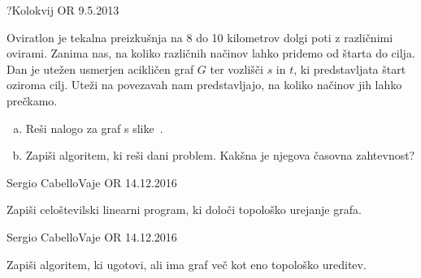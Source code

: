 \begin{naloga}{?}{Kolokvij OR 9.5.2013}
\begin{vprasanje}[oviratlon]
Oviratlon je tekalna preizkušnja
na 8 do 10 kilometrov dolgi poti z različnimi ovirami.
Zanima nas, na koliko različnih načinov lahko pridemo od štarta do cilja.
Dan je utežen usmerjen acikličen graf $G$ ter vozlišči $s$ in $t$,
ki predstavljata štart oziroma cilj.
Uteži na povezavah nam predstavljajo,
na koliko načinov jih lahko prečkamo.

\begin{enumerate}[(a)]
\item Reši nalogo za graf s slike~\fig{}.

\item Zapiši algoritem, ki reši dani problem.
Kakšna je njegova časovna zahtevnost?
\end{enumerate}

\begin{slika}
\pgfslika
{}
\end{slika}
\end{vprasanje}
\begin{odgovor}
\end{odgovor}
\end{naloga}


\begin{naloga}{Sergio Cabello}{Vaje OR 14.12.2016}
\begin{vprasanje}
Zapiši celoštevilski linearni program, ki določi topološko urejanje grafa.
\end{vprasanje}
\begin{odgovor}
\end{odgovor}
\end{naloga}


\begin{naloga}{Sergio Cabello}{Vaje OR 14.12.2016}
\begin{vprasanje}
Zapiši algoritem, ki ugotovi, ali ima graf več kot eno topološko ureditev.
\end{vprasanje}
\begin{odgovor}
\end{odgovor}
\end{naloga}


